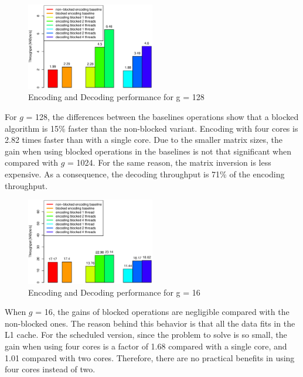 \begin{figure}[ht!]
\centering
\includegraphics[width=0.5\textwidth]{images/2015-04-18_encoding_decoding_128.eps}
\caption{Encoding and Decoding performance for g = 128 \cite{wunderlich2015network}}
\label{enc_dec128}
\end{figure}

For $g$ = 128, the differences between the baselines operations show that a
blocked algorithm is 15\% faster than the non-blocked variant. Encoding with
four cores is 2.82 times faster than with a single core. Due to the smaller
matrix sizes, the gain when using blocked operations in the baselines is not
that significant when compared with $g$ = 1024. For the same reason, the matrix
inversion is less expensive. As a consequence, the decoding throughput is 71\%
of the encoding throughput.

\begin{figure}[ht!]
\centering
\includegraphics[width=0.5\textwidth]{images/2015-04-18_encoding_decoding_16.eps}
\caption{Encoding and Decoding performance for g = 16 \cite{wunderlich2015network}}
\label{enc_dec16}
\end{figure}

When $g$ = 16, the gains of blocked operations are negligible compared with the
non-blocked ones. The reason behind this behavior is that all the data fits in
the L1 cache. For the scheduled version, since the problem to solve is so small,
the gain when using four cores is a factor of 1.68 compared with a single core,
and 1.01 compared with two cores. Therefore, there are no practical benefits in
using four cores instead of two.

